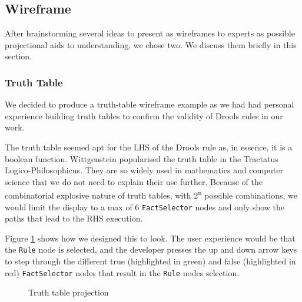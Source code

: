 \newpage

\subsection{Wireframe}

After brainstorming several ideas to present as wireframes to experts as possible projectional aids to understanding, we chose two.
We discuss them briefly in this section.

\subsubsection{Truth Table}
We decided to produce a truth-table wireframe example as we had had personal experience building truth tables to confirm the validity of Drools rules in our work.

The truth table seemed apt for the LHS of the Drools rule as, in essence, it is a boolean function.
Wittgenstein popularised the truth table in the Tractatus Logico-Philosophicus\cite{wittgenstein2013tractatus}.
They are so widely used in mathematics and computer science that we do not need to explain their use further.
Because of the combinatorial explosive nature of truth tables, with 2\textsuperscript{n} possible combinations, we would limit the display to a max of 6 \texttt{FactSelector} nodes and only show the paths that lead to the RHS execution.

Figure \ref{fig:TruthTableProjection} shows how we designed this to look.
The user experience would be that the \texttt{Rule} node is selected, and the developer presses the up and down arrow keys to step through the different true (highlighted in green) and false (highlighted in red) \texttt{FactSelector} nodes that result in the \texttt{Rule} nodes selection.

\begin{figure}[h]
    \centering
    \caption{Truth table projection}
    \label{fig:TruthTableProjection}
\end{figure}

